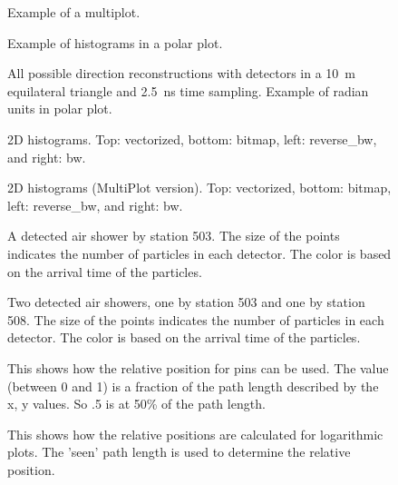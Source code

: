 \documentclass[a4paper,11pt]{article}
\begin{document}
\begin{figure}
\centering

\caption{Example of a multiplot.}
\end{figure}

\begin{figure}
\centering

\caption{Example of histograms in a polar plot.}
\end{figure}

\begin{figure}
\centering

\caption{All possible direction reconstructions with detectors in a
\SI{10}{\meter} equilateral triangle and \SI{2.5}{\nano\second} time
sampling. Example of radian units in polar plot.}
\end{figure}

\begin{figure}
\centering

\caption{2D histograms. Top: vectorized, bottom: bitmap, left:
reverse\_bw, and right: bw.}
\end{figure}

\begin{figure}
\centering

\caption{2D histograms (MultiPlot version). Top: vectorized, bottom:
bitmap, left: reverse\_bw, and right: bw.}
\end{figure}

\begin{figure}
\centering

\caption{A detected air shower by station 503. The size of the points
indicates the number of particles in each detector. The color is based
on the arrival time of the particles.}
\end{figure}

\begin{figure}
\centering

\caption{Two detected air showers, one by station 503 and one by station
508. The size of the points indicates the number of particles in each
detector. The color is based on the arrival time of the particles.}
\end{figure}

\begin{figure}
\centering

\caption{This shows how the relative position for pins can be used.
         The value (between 0 and 1) is a fraction of the path length
         described by the x, y values. So .5 is at 50\% of the path length.}
\end{figure}

\begin{figure}
\centering

\caption{This shows how the relative positions are calculated for
         logarithmic plots. The 'seen' path length is used to determine
         the relative position.}
\end{figure}
\end{document}
